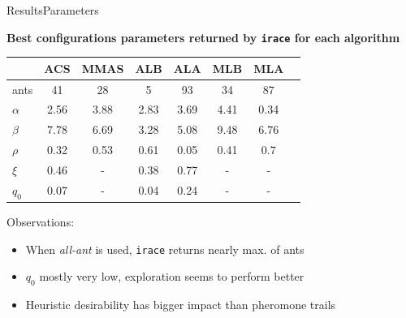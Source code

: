 \documentclass[10pt]{beamer}
\begin{document}
\begin{frame}{Results}{Parameters}

\textbf{Best configurations parameters returned by \texttt{irace} for each algorithm}


\begin{center}

\begin{tabular}{ | l | c | c | c | c | c | c | c | }
  \hline
      & ACS    & MMAS    & ALB & ALA & MLB & MLA \\
  \hline
  ants         & 41     & 28      & 5        &  93   & 34  & 87 \\
  \hline
  $\alpha$     & 2.56   & 3.88    & 2.83     &  3.69    &   4.41     & 0.34 \\
  \hline
  $\beta$      & 7.78   & 6.69    & 3.28     &  5.08     & 9.48      & 6.76 \\
  \hline
  $\rho$       & 0.32   & 0.53    & 0.61     &  0.05      &   0.41     & 0.7 \\
  \hline
  $\xi$        & 0.46   & -       & 0.38     &  0.77     &       -      & - \\
  \hline
  $q_0$        & 0.07   & -       & 0.04     &  0.24    &       -      & - \\
  \hline

\end{tabular}
\end{center}


Observations:
\begin{itemize}
  \item When \textit{all-ant} is used, \texttt{irace}  returns nearly max. of ants
  \item $q_0$ mostly very low, exploration seems to perform better
  \item Heuristic desirability has bigger impact than pheromone trails
\end{itemize}

\end{frame}
\end{document}
